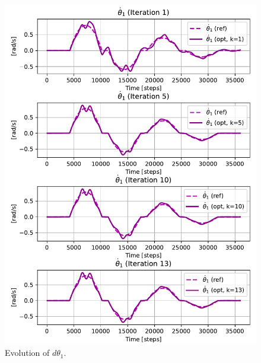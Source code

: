 \begin{figure}[htb]
    \centering
    \includegraphics[width=1\linewidth]{img/2-task2/th1dot_evolution.pdf}
    \caption{Evolution of $d\theta_1$.}
    \label{fig:dtheta1-evolution}
\end{figure}
    
